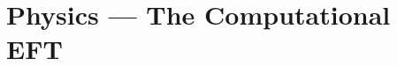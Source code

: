 \chapter{Physics --- The Computational EFT}\label{ch:physics}

\providecommand{\SuspendTagging}[1]{}
\providecommand{\ResumeTagging}[1]{}


